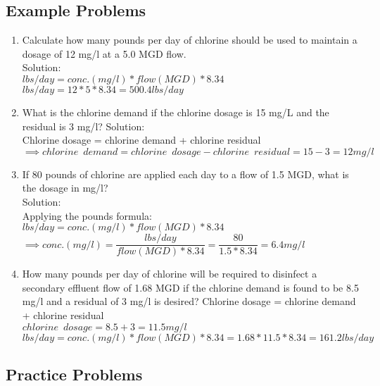 \documentclass{article}
\begin{document}
\subsection{Example Problems} 

\begin{enumerate}

\item Calculate how many pounds per day of chlorine should be used to maintain a dosage of 12 mg/l at a 5.0 MGD flow.\\
Solution:\\
$lbs/day=conc. (mg/l)*flow(MGD)*8.34$\\
$lbs/day=12*5*8.34=\boxed{500.4lbs/day}$\\
\item What is the chlorine demand if the chlorine dosage is 15 mg/L and the residual is 3 mg/l?
Solution:\\
Chlorine dosage = chlorine demand + chlorine residual\\
$\implies chlorine \enspace demand = chlorine \enspace dosage - chlorine \enspace residual=15-3=\boxed{12mg/l}$
\item If 80 pounds of chlorine are applied each day to a flow of 1.5 MGD, what is the dosage in mg/l?\\
Solution:\\
Applying the pounds formula:\\  $lbs/day=conc. (mg/l)*flow(MGD)*8.34$\\
$\implies conc. (mg/l)=\dfrac{lbs/day}{flow(MGD)*8.34}=\dfrac{80}{1.5*8.34}=\boxed{6.4mg/l}$
\item How many pounds per day of chlorine will be required to disinfect a secondary effluent flow of 1.68 MGD if the chlorine demand is found to be 8.5 mg/l and a residual of 3 mg/l is desired?
Chlorine dosage = chlorine demand + chlorine residual\\
$chlorine \enspace dosage=8.5+3=11.5mg/l$\\
$lbs/day=conc. (mg/l)*flow(MGD)*8.34=1.68*11.5*8.34=\boxed{161.2lbs/day}$\\


\end{enumerate}

\subsection{Practice Problems} 
\end{document}
